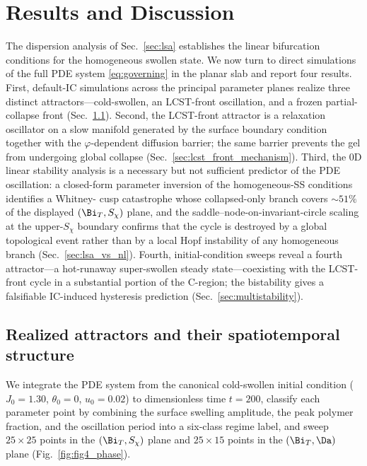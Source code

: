 
\section{Results and Discussion}
\label{sec:results}

The dispersion analysis of Sec.~\ref{sec:lsa} establishes the linear
bifurcation conditions for the homogeneous swollen state.  We now
turn to direct simulations of the full PDE system
\eqref{eq:governing} in the planar slab and report four results.
First, default-IC simulations across the principal parameter planes
realize three distinct attractors—cold-swollen, an LCST-front
oscillation, and a frozen partial-collapse front
(Sec.~\ref{sec:phasediagram}).  Second, the LCST-front attractor is
a relaxation oscillator on a slow manifold generated by the surface
boundary condition together with the $\varphi$-dependent diffusion
barrier; the same barrier prevents the gel from undergoing global
collapse (Sec.~\ref{sec:lcst_front_mechanism}).  Third, the 0D
linear stability analysis is a necessary but not sufficient
predictor of the PDE oscillation: a closed-form parameter
inversion of the homogeneous-SS conditions identifies a Whitney-
cusp catastrophe whose collapsed-only branch covers
$\sim\!51\%$ of the displayed $(\Bi_T,S_\chi)$ plane, and the
saddle--node-on-invariant-circle scaling at the upper-$S_\chi$
boundary confirms that the cycle is destroyed by a global
topological event rather than by a local Hopf instability of any
homogeneous branch (Sec.~\ref{sec:lsa_vs_nl}).  Fourth,
initial-condition sweeps reveal a fourth attractor—a hot-runaway
super-swollen steady state—coexisting with the LCST-front cycle in
a substantial portion of the C-region; the bistability gives a
falsifiable IC-induced hysteresis prediction
(Sec.~\ref{sec:multistability}).

\subsection{Realized attractors and their spatiotemporal structure}
\label{sec:phasediagram}

We integrate the PDE system from the canonical cold-swollen initial
condition ($J_0=1.30$, $\theta_0=0$, $u_0=0.02$) to dimensionless
time $t=200$, classify each parameter point by combining the surface
swelling amplitude, the peak polymer fraction, and the oscillation
period into a six-class regime label, and sweep $25\times25$ points
in the $(\Bi_T, S_\chi)$ plane and $25\times15$ points in the
$(\Bi_T, \Da)$ plane (Fig.~\ref{fig:fig4_phase}).


